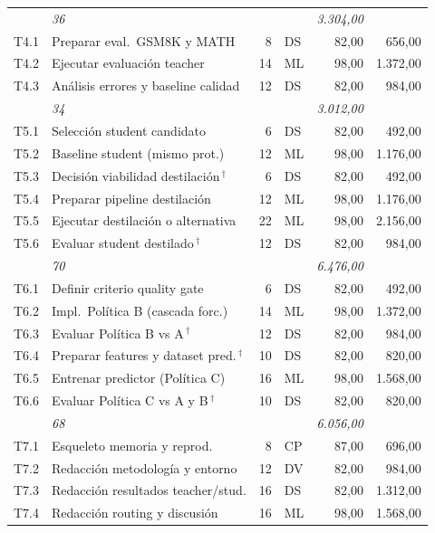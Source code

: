 {\begin{tabularx}{\textwidth}{>{\ttfamily}l >{\raggedright\arraybackslash}X r l r r}
\multicolumn{2}{r}{\textit{Subtotal F3}} & \textit{36} & & & \textit{3.304,00} \\
\addlinespace[1.5pt]
T4.1 & Preparar eval.\ GSM8K y MATH & 8 & DS & 82,00 & 656,00 \\
T4.2 & Ejecutar evaluación teacher & 14 & ML & 98,00 & 1.372,00 \\
T4.3 & Análisis errores y baseline calidad & 12 & DS & 82,00 & 984,00 \\
\multicolumn{2}{r}{\textit{Subtotal F4}} & \textit{34} & & & \textit{3.012,00} \\
\addlinespace[1.5pt]
T5.1 & Selección student candidato & 6 & DS & 82,00 & 492,00 \\
T5.2 & Baseline student (mismo prot.) & 12 & ML & 98,00 & 1.176,00 \\
T5.3 & Decisión viabilidad destilación$\,^\dagger$ & 6 & DS & 82,00 & 492,00 \\
T5.4 & Preparar pipeline destilación & 12 & ML & 98,00 & 1.176,00 \\
T5.5 & Ejecutar destilación o alternativa & 22 & ML & 98,00 & 2.156,00 \\
T5.6 & Evaluar student destilado$\,^\dagger$ & 12 & DS & 82,00 & 984,00 \\
\multicolumn{2}{r}{\textit{Subtotal F5}} & \textit{70} & & & \textit{6.476,00} \\
\addlinespace[1.5pt]
T6.1 & Definir criterio quality gate & 6 & DS & 82,00 & 492,00 \\
T6.2 & Impl.\ Política B (cascada forc.) & 14 & ML & 98,00 & 1.372,00 \\
T6.3 & Evaluar Política B vs A$\,^\dagger$ & 12 & DS & 82,00 & 984,00 \\
T6.4 & Preparar features y dataset pred.$\,^\dagger$ & 10 & DS & 82,00 & 820,00 \\
T6.5 & Entrenar predictor (Política C) & 16 & ML & 98,00 & 1.568,00 \\
T6.6 & Evaluar Política C vs A y B$\,^\dagger$ & 10 & DS & 82,00 & 820,00 \\
\multicolumn{2}{r}{\textit{Subtotal F6}} & \textit{68} & & & \textit{6.056,00} \\
\addlinespace[1.5pt]
T7.1 & Esqueleto memoria y reprod. & 8 & CP & 87,00 & 696,00 \\
T7.2 & Redacción metodología y entorno & 12 & DV & 82,00 & 984,00 \\
T7.3 & Redacción resultados teacher/stud. & 16 & DS & 82,00 & 1.312,00 \\
T7.4 & Redacción routing y discusión & 16 & ML & 98,00 & 1.568,00 \\

\end{tabularx}}
